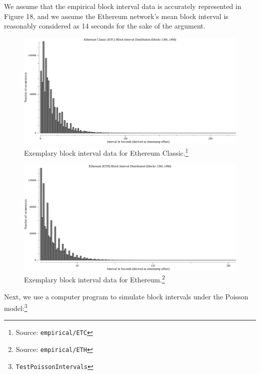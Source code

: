 \documentclass[11pt]{article}
\theoremstyle{plain}
\begin{document}
We assume that the empirical block interval data is accurately represented in Figure 18,
and we assume the Ethereum network's mean block interval is reasonably considered as 14 seconds
for the sake of the argument.

\begin{figure}[tph]
    \centering
    \includegraphics[width=1.0\textwidth]{vis_data_blockinterval_distribution_ETC.png}
    \caption{
      Exemplary block interval data for Ethereum Classic.\footnote{Source: \texttt{empirical/ETC}}
    }
\end{figure}

\begin{figure}[tph]
    \centering
    \includegraphics[width=1.0\textwidth]{vis_data_blockinterval_distribution_ETH.png}
    \caption{
        Exemplary block interval data for Ethereum.\footnote{Source: \texttt{empirical/ETH}}
    }
\end{figure}

Next, we use a computer program to simulate block intervals under the Poisson
model:\footnote{\texttt{TestPoissonIntervals}}
\end{document}
